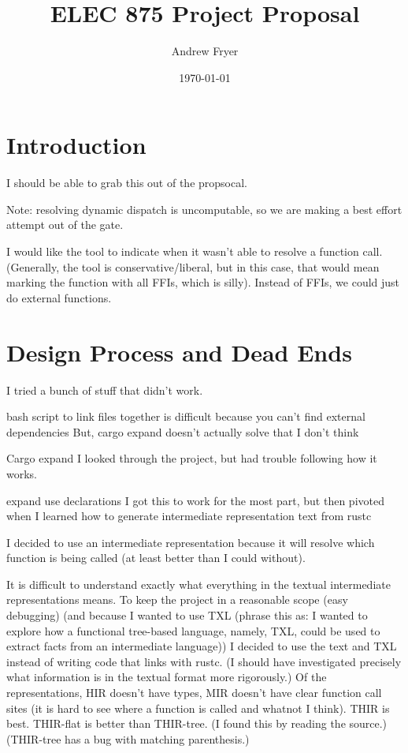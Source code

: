 \documentclass[11pt]{article}
\title{ELEC 875 Project Proposal}
\author{Andrew Fryer}
\date{\today}
\begin{document}
\maketitle

\section{Introduction}
I should be able to grab this out of the propsocal.

Note: resolving dynamic dispatch is uncomputable, so we are making a best effort attempt out of the gate.

I would like the tool to indicate when it wasn't able to resolve a function call.
(Generally, the tool is conservative/liberal, but in this case, that would mean marking the function with all FFIs, which is silly).
Instead of FFIs, we could just do external functions.

\section{Design Process and Dead Ends}
I tried a bunch of stuff that didn't work.

bash script to link files together is difficult because you can't find external dependencies
But, cargo expand doesn't actually solve that I don't think

Cargo expand
I looked through the project, but had trouble following how it works.

expand use declarations
I got this to work for the most part, but then pivoted when I learned how to generate intermediate representation text from rustc

I decided to use an intermediate representation because it will resolve which function is being called (at least better than I could without).

It is difficult to understand exactly what everything in the textual intermediate representations means.
To keep the project in a reasonable scope (easy debugging) (and because I wanted to use TXL (phrase this as: I wanted to explore how a functional tree-based language, namely, TXL, could be used to extract facts from an intermediate language)) I decided to use the text and TXL instead of writing code that links with rustc.
(I should have investigated precisely what information is in the textual format more rigorously.)
Of the representations, HIR doesn't have types, MIR doesn't have clear function call sites (it is hard to see where a function is called and whatnot I think).
THIR is best.
THIR-flat is better than THIR-tree. (I found this by reading the source.)
(THIR-tree has a bug with matching parenthesis.)
\end{document}

